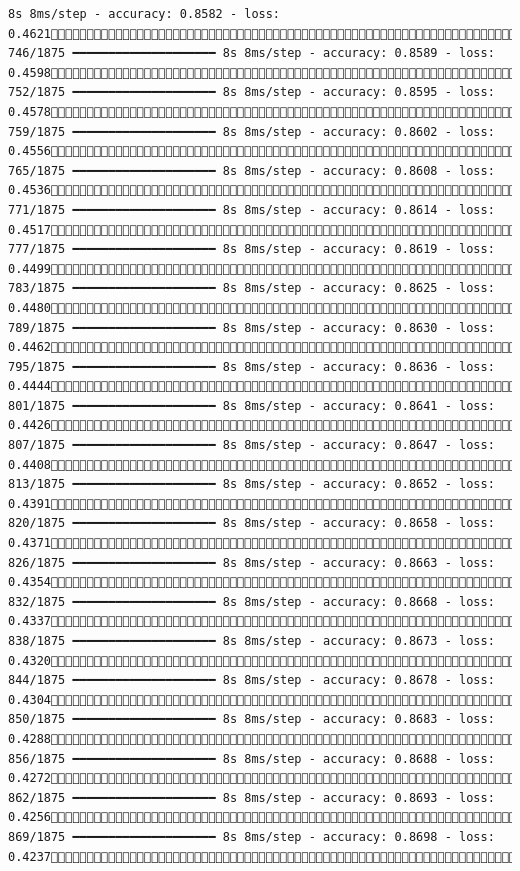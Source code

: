 \documentclass[
  letterpaper,
  DIV=11,
  numbers=noendperiod]{scrreprt}
\begin{document}
\begin{verbatim}
8s 8ms/step - accuracy: 0.8582 - loss: 0.4621 746/1875 ━━━━━━━━━━━━━━━━━━━━ 8s 8ms/step - accuracy: 0.8589 - loss: 0.4598 752/1875 ━━━━━━━━━━━━━━━━━━━━ 8s 8ms/step - accuracy: 0.8595 - loss: 0.4578 759/1875 ━━━━━━━━━━━━━━━━━━━━ 8s 8ms/step - accuracy: 0.8602 - loss: 0.4556 765/1875 ━━━━━━━━━━━━━━━━━━━━ 8s 8ms/step - accuracy: 0.8608 - loss: 0.4536 771/1875 ━━━━━━━━━━━━━━━━━━━━ 8s 8ms/step - accuracy: 0.8614 - loss: 0.4517 777/1875 ━━━━━━━━━━━━━━━━━━━━ 8s 8ms/step - accuracy: 0.8619 - loss: 0.4499 783/1875 ━━━━━━━━━━━━━━━━━━━━ 8s 8ms/step - accuracy: 0.8625 - loss: 0.4480 789/1875 ━━━━━━━━━━━━━━━━━━━━ 8s 8ms/step - accuracy: 0.8630 - loss: 0.4462 795/1875 ━━━━━━━━━━━━━━━━━━━━ 8s 8ms/step - accuracy: 0.8636 - loss: 0.4444 801/1875 ━━━━━━━━━━━━━━━━━━━━ 8s 8ms/step - accuracy: 0.8641 - loss: 0.4426 807/1875 ━━━━━━━━━━━━━━━━━━━━ 8s 8ms/step - accuracy: 0.8647 - loss: 0.4408 813/1875 ━━━━━━━━━━━━━━━━━━━━ 8s 8ms/step - accuracy: 0.8652 - loss: 0.4391 820/1875 ━━━━━━━━━━━━━━━━━━━━ 8s 8ms/step - accuracy: 0.8658 - loss: 0.4371 826/1875 ━━━━━━━━━━━━━━━━━━━━ 8s 8ms/step - accuracy: 0.8663 - loss: 0.4354 832/1875 ━━━━━━━━━━━━━━━━━━━━ 8s 8ms/step - accuracy: 0.8668 - loss: 0.4337 838/1875 ━━━━━━━━━━━━━━━━━━━━ 8s 8ms/step - accuracy: 0.8673 - loss: 0.4320 844/1875 ━━━━━━━━━━━━━━━━━━━━ 8s 8ms/step - accuracy: 0.8678 - loss: 0.4304 850/1875 ━━━━━━━━━━━━━━━━━━━━ 8s 8ms/step - accuracy: 0.8683 - loss: 0.4288 856/1875 ━━━━━━━━━━━━━━━━━━━━ 8s 8ms/step - accuracy: 0.8688 - loss: 0.4272 862/1875 ━━━━━━━━━━━━━━━━━━━━ 8s 8ms/step - accuracy: 0.8693 - loss: 0.4256 869/1875 ━━━━━━━━━━━━━━━━━━━━ 8s 8ms/step - accuracy: 0.8698 - loss: 0.4237 
\end{verbatim}
\end{document}
